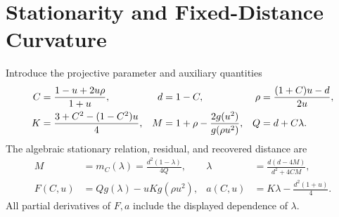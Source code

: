 \documentclass[12pt,letterpaper,onecolumn]{article}
\theoremstyle{definition}
\begin{document}
\section{Stationarity and Fixed-Distance Curvature}
Introduce the projective parameter and auxiliary quantities
\begin{align}
C&=\frac{1-u+2u\rho}{1+u},& d&=1-C,&
\rho&=\frac{(1+C)u-d}{2u},\notag\\
K&=\frac{3+C^2-(1-C^2)u}{4},&
M&=1+\rho-\frac{2g(u^2)}{g(\rho u^2)},&
Q&=d+C\lambda.\label{eq:chart}
\end{align}
The algebraic stationary relation, residual, and recovered distance are
\begin{align}
M&=m_C(\lambda)=\frac{d^2(1-\lambda)}{4Q},&
\lambda&=\frac{d(d-4M)}{d^2+4CM},\label{eq:eliminate}\\
F(C,u)&=Qg(\lambda)-uKg(\rho u^2),&
a(C,u)&=K\lambda-\frac{d^2(1+u)}4.\label{eq:residual}
\end{align}
All partial derivatives of \(F,a\) include the displayed dependence of \(\lambda\).
\end{document}
